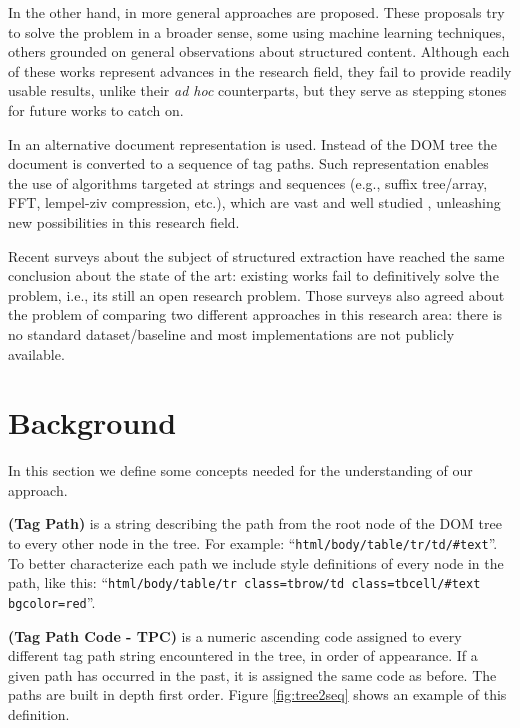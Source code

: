 \documentclass{vldb}
\begin{document}
In the other hand, in \cite{RRunner01, exalg2003, vips03, viper05, MDR03,
depta05, NET05, TPC09, vide10, gstm2010, fivatech2010, cvts2012, SuffixTree12,
clustVX2014, datapath2015, autorm2015} more general approaches are proposed.
These proposals try to solve the problem in a broader sense, some using machine
learning techniques, others grounded on general observations about structured
content. Although each of these works represent advances in the research field,
they fail to provide readily usable results, unlike their \textit{ad hoc}
counterparts, but they serve as stepping stones for future works to catch on.

In \cite{TPC09, SuffixTree12, TPS2013} an alternative document representation is
used. Instead of the DOM tree the document is converted to a sequence of tag
paths. Such representation enables the use of algorithms targeted at strings and
sequences (e.g., suffix tree/array\cite{ukkonen1995, manber1993suffix},
FFT\cite{fft1965}, lempel-ziv compression\cite{ziv1977universal}, etc.), which
are vast and well studied \cite{gusfield1997algorithms}, unleashing new
possibilities in this research field.

Recent surveys\cite{survey2013, survey2014} about the subject of structured
extraction have reached the same conclusion about the state of the art: existing
works fail to definitively solve the problem, i.e., its still an open research
problem. Those surveys also agreed about the problem of comparing two different
approaches in this research area: there is no standard dataset/baseline and most
implementations are not publicly available.

\section{Background}\label{sec:defs}
In this section we define some concepts needed for the understanding of our approach.

\begin{definition}\textbf{(Tag Path)} is a string describing the path from the
root node of the DOM tree to every other node in the tree. For example:
``\texttt{html/body/table/tr/td/\#text}''. To better characterize each path we
include style definitions of every node in the path, like this:
``\texttt{html/body/table/tr class=tbrow/td class=tbcell/\#text bgcolor=red}''.
\end{definition}

\begin{definition}\textbf{(Tag Path Code - TPC)} is a numeric ascending code
assigned to every different tag path string encountered in the tree, in order of
appearance. If a given path has occurred in the past, it is assigned the same
code as before. The paths are built in depth first order. Figure
\ref{fig:tree2seq} shows an example of this definition.
\end{definition}
\end{document}
